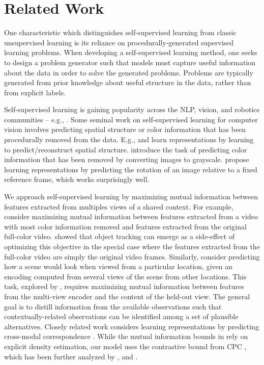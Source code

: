 \documentclass{article}
\begin{document}
 
\section{Related Work}
\label{sec:related}


One characteristic which distinguishes self-supervised learning from classic unsupervised learning is its reliance on procedurally-generated supervised learning problems. When developing a self-supervised learning method, one seeks to design a problem generator such that models must capture useful information about the data in order to solve the generated problems. Problems are typically generated from prior knowledge about useful structure in the data, rather than from explicit labels.

Self-supervised learning is gaining popularity across the NLP, vision, and robotics communities -- e.g., \citep{Devlin2019, Logeswaran2018, Sermanet2017, Dwibedi2018}. Some seminal work on self-supervised learning for computer vision involves predicting spatial structure or color information that has been procedurally removed from the data. E.g., \cite{Doersch2015} and \cite{Noroozi2016} learn representations by learning to predict/reconstruct spatial structure. \cite{zhang2016colorful} introduce the task of predicting color information that has been removed by converting images to grayscale. \cite{Gidaris2018} propose learning representations by predicting the rotation of an image relative to a fixed reference frame, which works surprisingly well.

We approach self-supervised learning by maximizing mutual information between features extracted from multiples views of a shared context.
For example, consider maximizing mutual information between features extracted from a video with most color information removed and features extracted from the original full-color video.
\citet{Vondrick2018} showed that object tracking can emerge as a side-effect of optimizing this objective in the special case where the features extracted from the full-color video are simply the original video frames.
Similarly, consider predicting how a scene would look when viewed from a particular location, given an encoding computed from several views of the scene from other locations.
This task, explored by \citet{Eslami2018}, requires maximizing mutual information between features from the multi-view encoder and the content of the held-out view.
The general goal is to distill information from the available observations such that contextually-related observations can be identified among a set of plausible alternatives. Closely related work considers learning representations by predicting cross-modal correspondence \citep{Arandjelovic2017, Arandjelovic2018}. While the mutual information bounds in \citep{Vondrick2018, Eslami2018} rely on explicit density estimation, our model uses the contrastive bound from CPC \citep{vandenOord2018}, which has been further analyzed by \cite{McAllester2018}, and \cite{Poole2019}.
\end{document}
